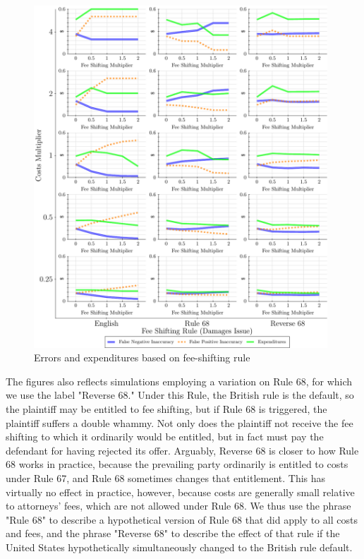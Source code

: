 \documentclass{article}
\begin{document}
\begin{figure}
\begin{minipage}{0.48\textwidth}
        \includegraphics[width=0.98\textwidth, scale=0.70, trim={0in 0in 0in 0in}, clip]{../Figures/Accuracy and Expenditures Varying Fee Shifting Rule (Damages Issue)} %
        \caption{Errors and expenditures based on fee-shifting rule}
		\label{fig:accexp_damagesrule}
    \end{minipage}
\end{figure}

The figures also reflects simulations employing a variation on Rule 68, for which we use the label "Reverse 68." Under this Rule, the British rule is the default, so the plaintiff may be entitled to fee shifting, but if Rule 68 is triggered, the plaintiff suffers a double whammy. Not only does the plaintiff not receive the fee shifting to which it ordinarily would be entitled, but in fact must pay the defendant for having rejected its offer. Arguably, Reverse 68 is closer to how Rule 68 works in practice, because the prevailing party ordinarily is entitled to costs under Rule 67, and Rule 68 sometimes changes that entitlement. This has virtually no effect in practice, however, because costs are generally small relative to attorneys' fees, which are not allowed under Rule 68. We thus use the phrase "Rule 68" to describe a hypothetical version of Rule 68 that did apply to all costs and fees, and the phrase "Reverse 68" to describe the effect of that rule if the United States hypothetically simultaneously changed to the British rule default.
\end{document}
